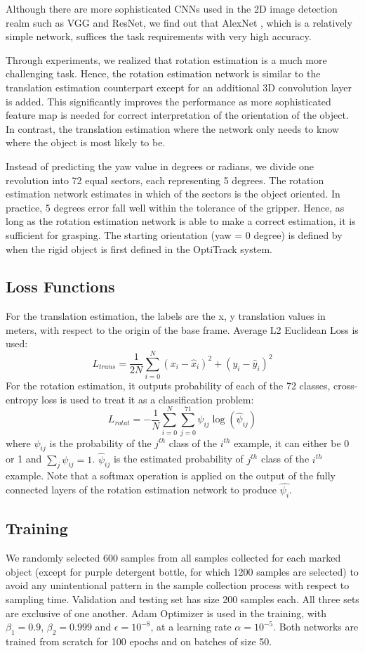 \documentclass[conference]{IEEEtran}
\begin{document}
Although there are more sophisticated CNNs used in the 2D image detection realm such as VGG and ResNet, we find out that AlexNet \cite{krizhevsky_2012_nips}, which is a relatively simple network, suffices the task requirements with very high accuracy.

Through experiments, we realized that rotation estimation is a much more challenging task. Hence, the rotation estimation network is similar to the translation estimation counterpart except for an additional 3D convolution layer is added. This significantly improves the performance as more sophisticated feature map is needed for correct interpretation of the orientation of the object. In contrast, the translation estimation where the network only needs to know where the object is most likely to be.

Instead of predicting the yaw value in degrees or radians, we divide one revolution into 72 equal sectors, each representing 5 degrees. The rotation estimation network estimates in which of the sectors is the object oriented. In practice, 5 degrees error fall well within the tolerance of the gripper. Hence, as long as the rotation estimation network is able to make a correct estimation, it is sufficient for grasping. The starting orientation (yaw = 0 degree) is defined by when the rigid object is first defined in the OptiTrack system.

\subsection{Loss Functions}
For the translation estimation, the labels are the x, y translation values in meters, with respect to the origin of the base frame. Average L2 Euclidean Loss is used:
$$L_{trans} = \frac{1}{2N}\sum_{i=0}^{N}
(x_{i} - \hat{x}_{i})^{2} + (y_{i} - \hat{y}_{i})^{2}$$
For the rotation estimation, it outputs probability of each of the 72 classes, cross-entropy loss is used to treat it as a classification problem:
$$L_{rotat} = - \frac{1}{N}\sum_{i=0}^{N}\sum_{j=0}^{71}\psi_{ij}\log(\hat{\psi}_{ij})$$
where $\psi_{ij}$ is the probability of the $j^{th}$ class of the $i^{th}$ example, it can either be 0 or 1 and $\sum_{j}\psi_{ij} = 1$. $\hat{\psi}_{ij}$ is the estimated probability of $j^{th}$ class of the $i^{th}$ example. Note that a softmax operation is applied on the output of the fully connected layers of the rotation estimation network to produce $\hat{\psi_{i}}$.

\subsection{Training}
We randomly selected 600 samples from all samples collected for each marked object (except for purple detergent bottle, for which 1200 samples are selected) to avoid any unintentional pattern in the sample collection process with respect to sampling time. Validation and testing set has size 200 samples each. All three sets are exclusive of one another.
Adam Optimizer is used in the training, with $\beta_{1} = 0.9$, $\beta_{2} = 0.999$ and $\epsilon = 10^{-8}$, at a learning rate $\alpha = 10^{-5}$. Both networks are trained from scratch for 100 epochs and on batches of size 50.
\end{document}
